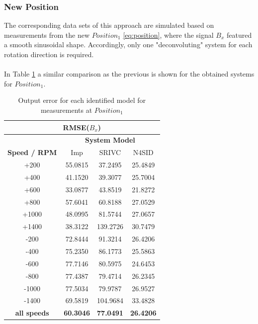 \documentclass[english]{isasthesis}
\begin{document}
	\subsubsection{New Position}
	The corresponding data sets of this approach are simulated based on measurements from the new $Position_1$ \eqref{eq:position}, where the signal $B_x$ featured a smooth sinusoidal shape. Accordingly, only one "deconvoluting" system for each rotation direction is required. \\\\
	In Table \ref{table:results position one} a similar comparison as the previous is shown for the obtained systems for $Position_1$. 
	\begin{table}[t]
	\centering
	\begin{tabular}{|c|c|c|c|}
	\hline
	\multicolumn{4}{|c|}{\textbf{RMSE($B_x$)}}                                    \\ \hline\hline
	\textbf{}            & \multicolumn{3}{c|}{\textbf{System Model}}             \\ \hline
	\textbf{Speed / RPM} & Imp              & SRIVC            & N4SID            \\ \hline
	+200                 & 55.0815          & 37.2495          & 25.4849          \\ \cline{1-1}
	+400                 & 41.1520          & 39.3077          & 25.7004          \\ \cline{1-1}
	+600                 & 33.0877          & 43.8519          & 21.8272          \\ \cline{1-1}
	+800                 & 57.6041          & 60.8188          & 27.0529          \\ \cline{1-1}
	+1000                & 48.0995          & 81.5744          & 27.0657          \\ \cline{1-1}
	+1400                & 38.3122          & 139.2726         & 30.7479          \\ \cline{1-1}
	-200                 & 72.8444          & 91.3214          & 26.4206          \\ \cline{1-1}
	-400                 & 75.2350          & 86.1773          & 25.5863          \\ \cline{1-1}
	-600                 & 77.7146          & 80.5975          & 24.6453          \\ \cline{1-1}
	-800                 & 77.4387          & 79.4714          & 26.2345          \\ \cline{1-1}
	-1000                & 77.5034          & 79.9787          & 26.9527          \\ \cline{1-1}
	-1400                & 69.5819          & 104.9684         & 33.4828          \\ \hline
	\textbf{all speeds}  & \textbf{60.3046} & \textbf{77.0491} & \textbf{26.4206} \\ \hline
	\end{tabular}
	\caption{Output error for each identified model for measurements at $Position_1$}
	\label{table:results position one}
	\end{table}
\end{document}
